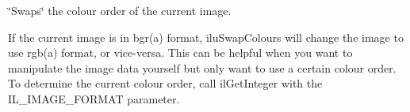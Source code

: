 \char`\"{}\-Swaps\char`\"{} the colour order of the current image. 

If the current image is in bgr(a) format, ilu\-Swap\-Colours will change the image to use rgb(a) format, or vice-\/versa. This can be helpful when you want to manipulate the image data yourself but only want to use a certain colour order. To determine the current colour order, call il\-Get\-Integer with the I\-L\-\_\-\-I\-M\-A\-G\-E\-\_\-\-F\-O\-R\-M\-A\-T parameter. 